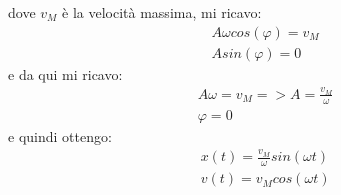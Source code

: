             dove $v_M$ è la velocità massima, mi ricavo:
            \begin{align*}
                &A\omega cos(\varphi)=v_M\\
                &Asin(\varphi)=0
            \end{align*}
            e da qui mi ricavo:
            \begin{align*}
                &A\omega=v_M=>A=\frac{v_M}{\omega}\\
                &\varphi=0
            \end{align*}
            e quindi ottengo:
            \begin{align*}
                &x(t)=\frac{v_M}{\omega}sin(\omega t)\\
                &v(t)=v_Mcos(\omega t)
            \end{align*}


